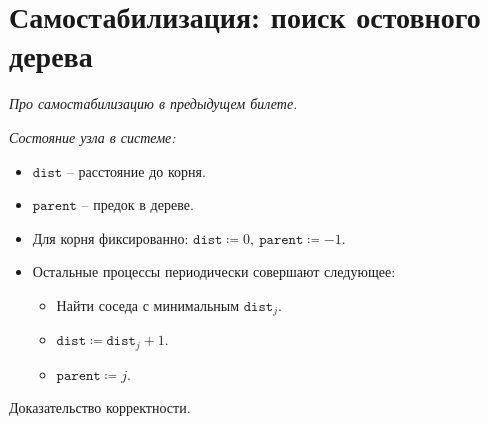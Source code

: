 \section{Самостабилизация: поиск остовного дерева}

\textit{Про самостабилизацию в предыдущем билете.}

\begin{definition} \textit{Состояние узла в системе:}
    \begin{itemize}
        \item $\texttt{dist}$ -- расстояние до корня.
        \item $\texttt{parent}$ -- предок в дереве.
    \end{itemize}
\end{definition}

\begin{algorithm}
    \enewline
    \begin{itemize}
        \item Для корня фиксированно: $\texttt{dist} \coloneqq 0,~ 
            \texttt{parent} \coloneqq -1$.
        \item Остальные процессы периодически совершают следующее:
            \begin{itemize}
                \item Найти соседа с минимальным $\texttt{dist}_j$.
                \item $\texttt{dist} \coloneqq \texttt{dist}_j + 1$.
                \item $\texttt{parent} \coloneqq j$.
            \end{itemize}
    \end{itemize}
\end{algorithm}

\begin{exercise}
    Доказательство корректности.
\end{exercise}

